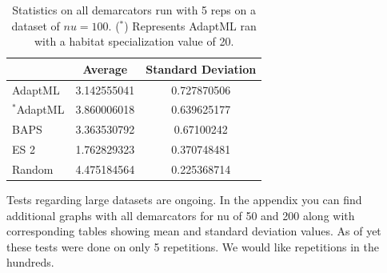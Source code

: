 \begin{table}[h!]
    \begin{tabular}{l|cc}
    ~                    & Average     & Standard Deviation \\ \hline
    AdaptML              & 3.142555041 & 0.727870506        \\
    $^\ast$AdaptML              & 3.860006018 & 0.639625177        \\
    BAPS                 & 3.363530792 & 0.67100242         \\
    ES 2 & 1.762829323 & 0.370748481        \\
    Random               & 4.475184564 & 0.225368714        \\
    \end{tabular}
    \caption[Statistics on all demarcators on $nu=100$.]{Statistics on all demarcators run with 5 reps on a dataset of $nu=100$. ($^\ast$) Represents AdaptML ran with a habitat specialization value of 20. }
        \label{tab:100Allmean}
\end{table}

Tests regarding large datasets are ongoing.
In the appendix you can find additional graphs with all demarcators for nu of 50 and 200 along with corresponding tables showing mean and standard deviation values.
As of yet these tests were done on only 5 repetitions.
We would like repetitions in the hundreds.

